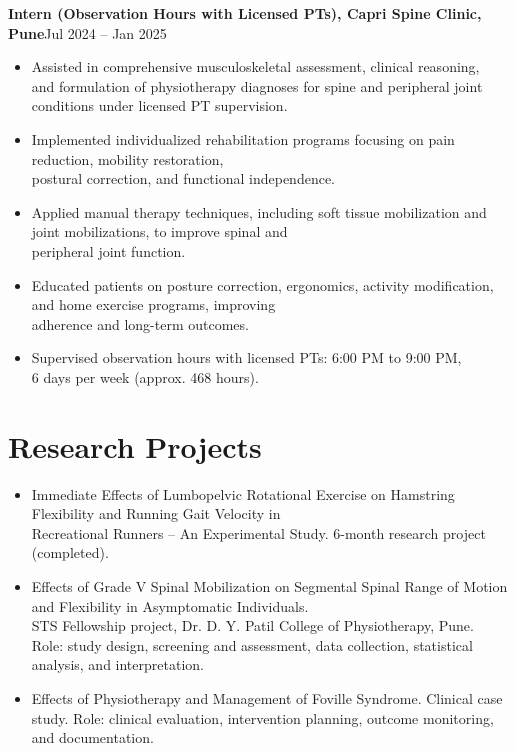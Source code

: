 \documentclass[11pt]{article}
\newcommand{\cvsubheading}[2]{\textbf{#1}\hfill #2\\}
\begin{document}
\cvsubheading{Intern (Observation Hours with Licensed PTs), Capri Spine Clinic, Pune}{Jul 2024 -- Jan 2025}
\begin{itemize}
  \item Assisted in comprehensive musculoskeletal assessment, clinical reasoning,\\
  and formulation of physiotherapy diagnoses for spine and peripheral joint conditions under licensed PT supervision.
  \item Implemented individualized rehabilitation programs focusing on pain reduction, mobility restoration,\\
  postural correction, and functional independence.
  \item Applied manual therapy techniques, including soft tissue mobilization and joint mobilizations, to improve spinal and\\
  peripheral joint function.
  \item Educated patients on posture correction, ergonomics, activity modification, and home exercise programs, improving\\
  adherence and long-term outcomes.
  \item Supervised observation hours with licensed PTs: 6:00 PM to 9:00 PM,\\
  6 days per week (approx. 468 hours).
\end{itemize}

\section*{Research Projects}
\begin{itemize}
  \item Immediate Effects of Lumbopelvic Rotational Exercise on Hamstring Flexibility and Running Gait Velocity in\\
  Recreational Runners -- An Experimental Study. 6-month research project (completed).
  \item Effects of Grade V Spinal Mobilization on Segmental Spinal Range of Motion and Flexibility in Asymptomatic Individuals.\\
  STS Fellowship project, Dr. D. Y. Patil College of Physiotherapy, Pune.\\
  Role: study design, screening and assessment, data collection, statistical analysis, and interpretation.
  \item Effects of Physiotherapy and Management of Foville Syndrome. Clinical case study. Role: clinical evaluation, intervention planning, outcome monitoring, and documentation.
\end{itemize}
\end{document}
